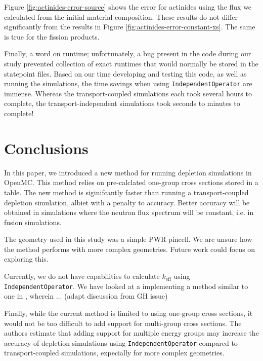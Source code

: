 \documentclass[a4paper,fleqn]{cas-dc}
\begin{document}
    Figure \ref{fig:actinides-error-source} shows the error for actinides using
    the flux we calculated from the initial material composition. These results
    do not differ significantly from the results in Figure
    \ref{fig:actinides-error-constant-xs}. The same is true for the fission
    products.

    Finally, a word on runtime; unfortunately, a bug present in the code during
    our study prevented collection of exact runtimes that would normally be
    stored in the statepoint files. Based on our time developing and testing
    this code, as well as running the simulations, the time savings when using
    \verb.IndependentOperator. are immense. Whereas the transport-coupled
    simulations each took several hours to complete, the transport-independent
    simulations took seconds to minutes to complete!

\section{Conclusions}\label{sec:conclusion}
    In this paper, we introduced a new method for running depletion simulations
    in OpenMC. This method relies on pre-calclated one-group cross sections
    stored in a table. The new method is siginifcantly faster than running a
    transport-coupled depletion simulation, albiet with a penalty to accuracy.
    Better accuracy will be obtained in simulations where the neutron flux
    spectrum will be constant, i.e. in fusion simulations.
    
    The geometry used in this study was a simple PWR pincell. We are unsure how
    the method performs with more complex geometries. Future work could
    focus on exploring this.
     
    Currently, we do not have capabilities to calculate $k_\text{eff}$ using
    \verb.IndependentOperator.. We have looked at a implementing a method
    similar to one in  \cite{LOVECKY2014333}, wherein ... (adapt discussion from
    GH issue)

    Finally, while the current method is limited to using one-group cross
    sections, it would not be too difficult to add support for multi-group cross
    sections. The authors estimate that adding support for multiple energy
    groups may increase the accuracy of depletion simulations using
    \verb.IndependentOperator. compared to transport-coupled simulations,
    expecially for more complex geometries.
\end{document}
